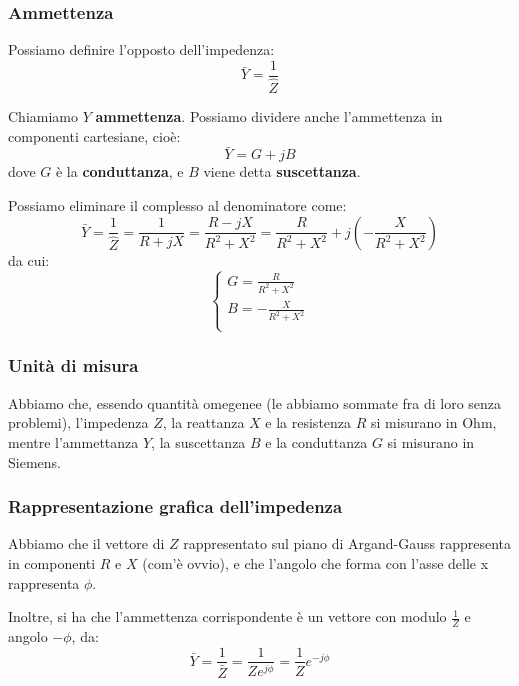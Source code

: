 \documentclass[a4paper,11pt]{article}
\begin{document}
\subsubsection{Ammettenza}
Possiamo definire l'opposto dell'impedenza:
$$
\bar{Y} = \frac{1}{\hat{Z}}
$$

Chiamiamo $Y$ \textbf{ammettenza}.
Possiamo dividere anche l'ammettenza in componenti cartesiane, cioè:
$$
\bar{Y} = G + j B
$$
dove $G$ è la \textbf{conduttanza}, e $B$ viene detta \textbf{suscettanza}.

Possiamo eliminare il complesso al denominatore come:
$$
\bar{Y} = \frac{1}{\hat{Z}} = \frac{1}{R + jX} = \frac{R - jX}{R^2 + X^2} = \frac{R}{R^2 + X^2} + j \left(-\frac{X}{R^2 + X^2}\right)
$$
da cui:
\[
	\begin{cases}
		G = \frac{R}{R^2 + X^2} \\ 	
		B = -\frac{X}{R^2 + X^2} \\ 	
	\end{cases}
\]

\subsubsection{Unità di misura}
Abbiamo che, essendo quantità omegenee (le abbiamo sommate fra di loro senza problemi), l'impedenza $Z$, la reattanza $X$ e la resistenza $R$ si misurano in Ohm, mentre l'ammettanza $Y$, la suscettanza $B$ e la conduttanza $G$ si misurano in Siemens.

\subsubsection{Rappresentazione grafica dell'impedenza}
Abbiamo che il vettore di $Z$ rappresentato sul piano di Argand-Gauss rappresenta in componenti $R$ e $X$ (com'è ovvio), e che l'angolo che forma con l'asse delle x rappresenta $\phi$.

Inoltre, si  ha che l'ammettenza corrispondente è un vettore con modulo $\frac{1}{Z}$ e angolo $-\phi$, da:
$$
\bar{Y} = \frac{1}{\bar{Z}} = \frac{1}{Ze^{j\phi}} = \frac{1}{Z} e^{-j\phi}
$$

\begin{center}
\end{center}
\end{document}
